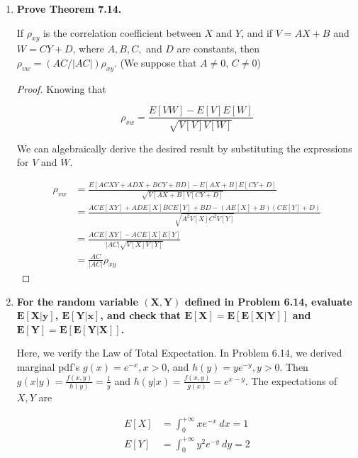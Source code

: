 \documentclass[10pt, oneside]{article}
\begin{document}
\begin{enumerate}[label=7.\arabic*]
\item  \begin{tcolorbox}[
  colback=Cerulean!5!white,
  colframe=Cerulean!75!black]
  \textbf{Prove Theorem 7.14.}
  \end{tcolorbox}
  
  \begin{thm*}
  If $\rho_{xy}$ is the correlation coefficient between $X$ and $Y$, and if $V = AX + B$ and $W = CY + D$, where $A, B, C,$ and $D$ are constants, then $\rho_{vw} = (AC / |AC|) \rho_{xy}$. (We suppose that $A \neq 0$, $C \neq 0$)
  \end{thm*}
  
  \begin{proof}
  Knowing that 
  
  \[ \rho_{vw} = \frac{E[VW] - E[V] E[W]}{\sqrt{V[V] V[W]}} \]
  
  We can algebraically derive the desired result by substituting the expressions for $V$ and $W$.
  
  \begin{align*}
  \rho_{vw} &= \frac{E[ACXY + ADX + BCY + BD] - E[AX + B] E[CY + D]}{\sqrt{V[AX+B] V[CY + D]}} \\
  &= \frac{ACE[XY] + ADE[X] BCE[Y] + BD - (AE[X] + B)(CE[Y] + D)}{\sqrt{A^2 V[X] C^2 V[Y]}} \\
  &= \frac{ACE[XY] - ACE[X] E[Y]}{|AC| \sqrt{V[X] V[Y]}} \\
  &= \boxed{\frac{AC}{|AC|} \rho_{xy}}
  \end{align*}
  \end{proof}
  
\item  \begin{tcolorbox}[
  colback=Cerulean!5!white,
  colframe=Cerulean!75!black]
  \textbf{For the random variable $\bm{(X,Y)}$ defined in Problem 6.14, evaluate $\bm{E[X | y]}$, $\bm{E[Y | x]}$, and check that $\bm{E[X] = E[E[X | Y]]}$ and $\bm{E[Y] = E[E[Y | X]]}$.}
  \end{tcolorbox}
  
  Here, we verify the Law of Total Expectation. In Problem 6.14, we derived marginal pdf's $g(x) = e^{-x}, x > 0$, and $h(y) = ye^{-y}, y > 0$. Then $g(x | y) = \frac{f(x,y)}{h(y)} = \frac{1}{y}$ and $h(y | x) = \frac{f(x,y)}{g(x)} = e^{x-y}$. The expectations of $X, Y$ are 
  
  \begin{align*}
  E[X] &= \int^{+\infty}_0 x e^{-x} \ dx = \boxed{1} \\
  E[Y] &= \int^{+\infty}_0 y^2 e^{-y} \ dy = \boxed{2}
  \end{align*}
  

\end{enumerate}
\end{document}
